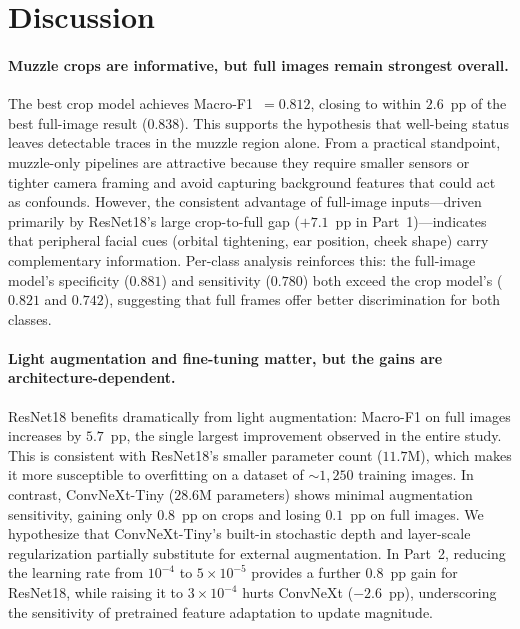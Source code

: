 \documentclass[sigconf]{acmart}
\begin{document}
\section{Discussion}
\label{sec:discussion}

\paragraph{Muzzle crops are informative, but full images remain strongest
overall.}
The best crop model achieves Macro-F1~$=0.812$, closing to within $2.6$~pp of
the best full-image result ($0.838$). This supports the hypothesis that
well-being status leaves detectable traces in the muzzle region alone. From
a practical standpoint, muzzle-only pipelines are attractive because they
require smaller sensors or tighter camera framing and avoid capturing
background features that could act as confounds. However, the consistent
advantage of full-image inputs---driven primarily by ResNet18's large
crop-to-full gap ($+7.1$~pp in Part~1)---indicates that peripheral facial cues
(orbital tightening, ear position, cheek shape) carry complementary
information. Per-class analysis reinforces this: the full-image model's
specificity ($0.881$) and sensitivity ($0.780$) both exceed the crop model's
($0.821$ and $0.742$), suggesting that full frames offer better
discrimination for both classes.

\paragraph{Light augmentation and fine-tuning matter, but the gains are
architecture-dependent.}
ResNet18 benefits dramatically from light augmentation: Macro-F1 on full
images increases by $5.7$~pp, the single largest improvement observed in the
entire study. This is consistent with ResNet18's smaller parameter count
($11.7$M), which makes it more susceptible to overfitting on a dataset of
${\sim}1{,}250$ training images. In contrast, ConvNeXt-Tiny ($28.6$M
parameters) shows minimal augmentation sensitivity, gaining only $0.8$~pp on
crops and losing $0.1$~pp on full images. We hypothesize that ConvNeXt-Tiny's
built-in stochastic depth and layer-scale regularization partially substitute
for external augmentation. In Part~2, reducing the learning rate from
$10^{-4}$ to $5\times10^{-5}$ provides a further $0.8$~pp gain for ResNet18,
while raising it to $3\times10^{-4}$ hurts ConvNeXt ($-2.6$~pp),
underscoring the sensitivity of pretrained feature adaptation to update
magnitude.
\end{document}
